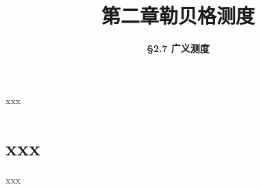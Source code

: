 


\title[第二章\\
勒贝格测度]{\texorpdfstring{\LARGE \bfseries 第二章\quad 勒贝格测度}{第二章 勒贝格测度}} %
\author[\S 2.7\\
广义测度] %
{\Large \bfseries \S 2.7 广义测度}
\date{}





\begin{frame}

\titlepage %

\end{frame}





\begin{frame}{xxx}



\end{frame}


\section{xxx}


\begin{frame}{xxx}


\end{frame}



